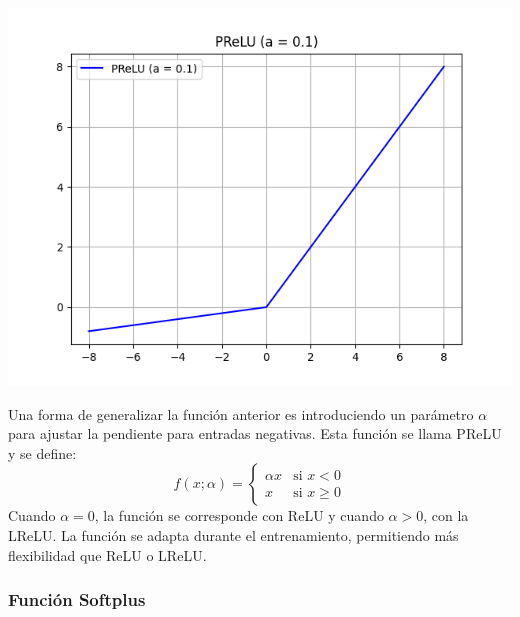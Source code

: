\begin{minipage}{0.35\textwidth}
    \includegraphics[width=1.1\textwidth]{img/PReLU.png}
    \label{img: PReLU}
\end{minipage}
\begin{minipage}{0.05\textwidth}
\textbf{ }
\end{minipage}
\begin{minipage}{0.6\textwidth}
    Una forma de generalizar la función anterior es introduciendo un parámetro \(\alpha\) para ajustar la pendiente para entradas negativas. Esta función se llama PReLU y se define:
\begin{equation}
    f(x; \alpha) = 
    \begin{cases} 
      \alpha x & \text{si } x < 0 \\ 
      x & \text{si } x \geq 0 
    \end{cases}
    \label{eq:prelu}
\end{equation}
Cuando $\alpha = 0$, la función se corresponde con ReLU y cuando $\alpha > 0$, con la LReLU. La función se adapta durante el entrenamiento, permitiendo más flexibilidad que ReLU o LReLU. 
\end{minipage}

\subsubsection*{Función Softplus}

